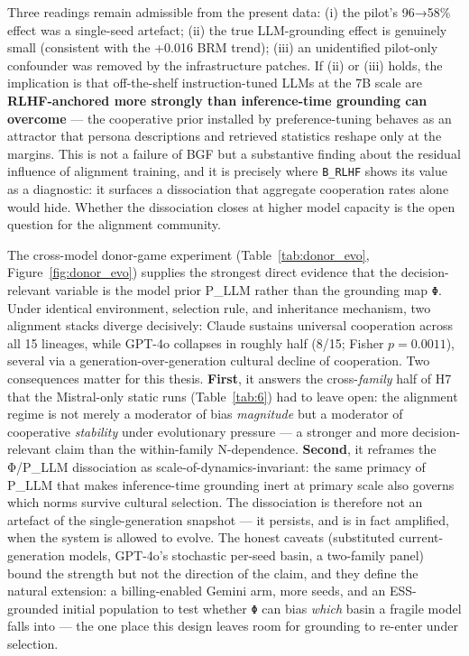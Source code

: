 Three readings remain admissible from the present data: (i) the pilot's 96→58\% effect was a single-seed artefact; (ii) the true LLM-grounding effect is genuinely small (consistent with the +0.016 BRM trend); (iii) an unidentified pilot-only confounder was removed by the infrastructure patches. If (ii) or (iii) holds, the implication is that off-the-shelf instruction-tuned LLMs at the 7B scale are \textbf{RLHF-anchored more strongly than inference-time grounding can overcome} — the cooperative prior installed by preference-tuning behaves as an attractor that persona descriptions and retrieved statistics reshape only at the margins. This is not a failure of BGF but a substantive finding about the residual influence of alignment training, and it is precisely where \texttt{B\_RLHF} shows its value as a diagnostic: it surfaces a dissociation that aggregate cooperation rates alone would hide. Whether the dissociation closes at higher model capacity is the open question for the alignment community.


The cross-model donor-game experiment (Table~\ref{tab:donor_evo}, Figure~\ref{fig:donor_evo}) supplies the strongest direct evidence that the decision-relevant variable is the model prior P\_LLM rather than the grounding map \texttt{Φ}. Under identical environment, selection rule, and inheritance mechanism, two alignment stacks diverge decisively: Claude sustains universal cooperation across all 15 lineages, while GPT-4o collapses in roughly half (8/15; Fisher $p = 0.0011$), several via a generation-over-generation cultural decline of cooperation. Two consequences matter for this thesis. \textbf{First}, it answers the cross-\textit{family} half of H7 that the Mistral-only static runs (Table~\ref{tab:6}) had to leave open: the alignment regime is not merely a moderator of bias \textit{magnitude} but a moderator of cooperative \textit{stability} under evolutionary pressure — a stronger and more decision-relevant claim than the within-family N-dependence. \textbf{Second}, it reframes the Φ/P\_LLM dissociation as scale-of-dynamics-invariant: the same primacy of P\_LLM that makes inference-time grounding inert at primary scale also governs which norms survive cultural selection. The dissociation is therefore not an artefact of the single-generation snapshot — it persists, and is in fact amplified, when the system is allowed to evolve. The honest caveats (substituted current-generation models, GPT-4o's stochastic per-seed basin, a two-family panel) bound the strength but not the direction of the claim, and they define the natural extension: a billing-enabled Gemini arm, more seeds, and an ESS-grounded initial population to test whether \texttt{Φ} can bias \textit{which} basin a fragile model falls into — the one place this design leaves room for grounding to re-enter under selection.

